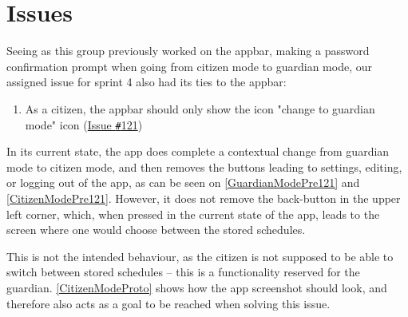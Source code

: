 \section{Issues}\label{SEC:Sprint4Issues}
Seeing as this group previously worked on the appbar, making a password confirmation prompt when going from citizen mode to guardian mode, our assigned issue for sprint 4 also had its ties to the appbar:

\begin{enumerate}
  \item As a citizen, the appbar should only show the icon "change to guardian mode" icon (\href{https://github.com/aau-giraf/weekplanner/issues/121}{Issue \texttt{\#}121})
\end{enumerate}

In its current state, the app does complete a contextual change from guardian mode to citizen mode, and then removes the buttons leading to settings, editing, or logging out of the app, as can be seen on \autoref{GuardianModePre121} and \autoref{CitizenModePre121}.
However, it does not remove the back-button in the upper left corner, which, when pressed in the current state of the app, leads to the screen where one would choose between the stored schedules.


This is not the intended behaviour, as the citizen is not supposed to be able to switch between stored schedules -- this is a functionality reserved for the guardian.
\autoref{CitizenModeProto} shows how the app screenshot should look, and therefore also acts as a goal to be reached when solving this issue.

